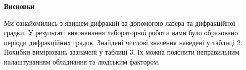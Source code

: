 \begin{center}
    \Large{\textbf{Висновки}}    
\end{center}

\vspace{1mm}

Ми ознайомились з явищем дифракції за допомогою лазера та дифракційної градки.
У результаті виконанання лабораторної роботи нами було обраховано 
періоди дифракційних градок. Знайдені числові значення наведені у таблиці 2. 
Похибки вимірювань зазначені у таблиці 3. Їх можна 
пояснити неправильним налаштуванням обладнання та людським
фактором.